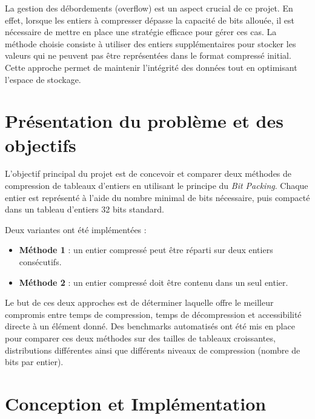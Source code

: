 \documentclass{rapportClass} %
\begin{document}
La gestion des débordements (overflow) est un aspect crucial de ce projet. En effet, lorsque les entiers à compresser
dépasse la capacité de bits allouée, il est nécessaire de mettre en place une stratégie efficace pour gérer ces cas.
La méthode choisie consiste à utiliser des entiers supplémentaires pour stocker les valeurs qui ne peuvent pas être représentées
dans le format compressé initial. Cette approche permet de maintenir l’intégrité des données tout en optimisant l’espace de stockage.






\chapter{Présentation du problème et des objectifs}

L’objectif principal du projet est de concevoir et comparer deux méthodes de compression
de tableaux d’entiers en utilisant le principe du \textit{Bit Packing}.
Chaque entier est représenté à l’aide du nombre minimal de bits nécessaire, puis compacté dans un tableau
d’entiers 32 bits standard.

Deux variantes ont été implémentées :
\begin{itemize}
    \item \textbf{Méthode 1} : un entier compressé peut être réparti sur deux entiers consécutifs.
    \item \textbf{Méthode 2} : un entier compressé doit être contenu dans un seul entier.
\end{itemize}

\vspace{1em}
Le but de ces deux approches est de déterminer laquelle offre le meilleur compromis entre
temps de compression, temps de décompression et accessibilité directe à un élément donné.
Des benchmarks automatisés ont été mis en place pour comparer ces deux méthodes sur des tailles
de tableaux croissantes, distributions différentes ainsi que différents niveaux de compression (nombre de bits par entier).


\chapter{Conception et Implémentation}
\end{document}
